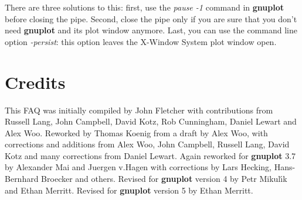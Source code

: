 \documentclass[a4paper,11pt]{article}
\newcommand{\gnuplot}{\textbf{gnuplot }}
\begin{document}
There are three solutions to this: first, use the {\em pause -1}
command in \gnuplot before closing the pipe. Second, close the pipe
only if you are sure that you don't need \gnuplot and its plot window
anymore. Last, you can use the command line option {\em -persist}: this
option leaves the X-Window System plot window open.


\section{Credits}

This FAQ was initially compiled by John Fletcher with contributions
from Russell Lang, John Campbell, David Kotz, Rob Cunningham, Daniel
Lewart and Alex Woo. Reworked by Thomas Koenig from a draft
by Alex Woo, with corrections and additions from Alex Woo, John
Campbell, Russell Lang, David Kotz and many corrections from Daniel Lewart.
Again reworked for \gnuplot 3.7 by Alexander Mai and Juergen v.Hagen
with corrections by Lars Hecking, Hans-Bernhard Broecker and others.
Revised for \gnuplot version 4 by Petr Mikul\'{\i}k and Ethan Merritt.
Revised for \gnuplot version 5 by Ethan Merritt.
\end{document}
